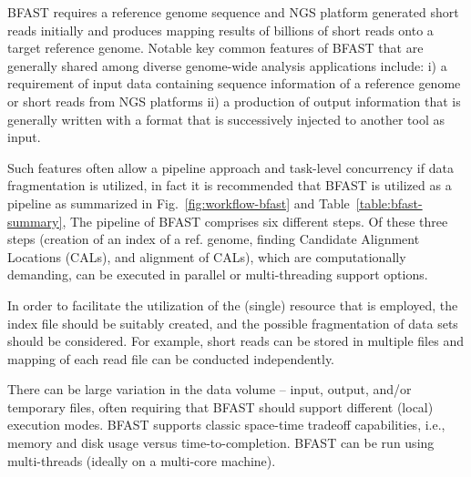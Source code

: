 \documentclass{cpeauth}
\begin{document}

BFAST requires a reference genome sequence and NGS
platform generated short reads initially and produces mapping results
of billions of short reads onto a target reference genome.  Notable
key common features of BFAST that are generally shared among diverse genome-wide analysis applications include: i) a requirement of input data containing
sequence information of a reference genome or short reads from NGS
platforms ii) a production of output information that is generally
written with a format that is successively injected to another tool as
input.






Such features often allow a pipeline approach and task-level
concurrency if data fragmentation is utilized, in fact it is
recommended that BFAST is utilized as a pipeline as summarized in
Fig.~\ref{fig:workflow-bfast} and Table~\ref{table:bfast-summary}, The
pipeline of BFAST comprises six different steps. Of these three steps
(creation of an index of a ref. genome, finding Candidate Alignment
Locations (CALs), and alignment of CALs), which are computationally
demanding, can be executed in parallel or multi-threading support
options.
 
In order to facilitate the utilization of the (single) resource that
is employed, the index file should be suitably created, and the
possible fragmentation of data sets should be considered.  For
example, short reads can be stored in multiple files and mapping of
each read file can be conducted independently.
 
There can be large variation in the data volume -- input, output,
and/or temporary files, often requiring that BFAST should support
different (local) execution modes.  BFAST supports classic space-time
tradeoff capabilities, i.e., memory and disk usage versus
time-to-completion. BFAST can be run using multi-threads (ideally
on a multi-core machine).
\end{document}
